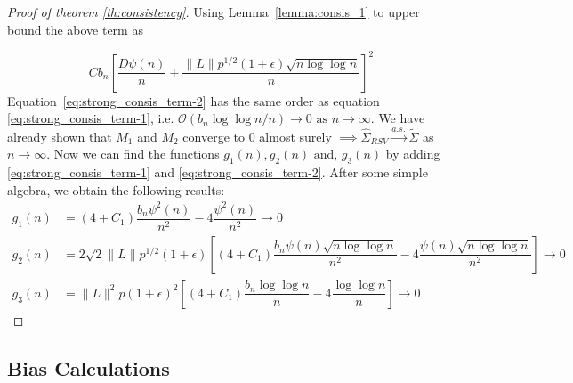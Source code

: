\documentclass[12pt]{article}
\theoremstyle{remark}
\begin{document}
\begin{proof}[Proof of theorem \ref{th:consistency}]
Using Lemma~\ref{lemma:consis_1} to upper bound the above term as 

\begin{equation} \label{eq:strong_consis_term-2}
     Cb_n\left[ \dfrac{D \psi(n)}{n} + \dfrac{\|L\| p^{1/2}(1+\epsilon)\sqrt{n \log\log n}}{n}  \right]^2
\end{equation}
%
Equation~\eqref{eq:strong_consis_term-2} has the same order as equation \eqref{eq:strong_consis_term-1}, i.e. $\mathcal{O}\left(b_n \log \log n/n\right) \to 0 \textrm{ as } n \to \infty$.
We have already shown that $M_1$ and $M_2$ converge to 0 almost surely $\implies \hat{\Sigma}_{RSV} \xrightarrow{a.s.} \tilde{\Sigma}$ as $n \to \infty$. Now we can find the functions $g_1(n), g_2(n) \textrm{ and, } g_3(n)$ by adding \eqref{eq:strong_consis_term-1} and \eqref{eq:strong_consis_term-2}. After some simple algebra, we obtain the following results:
%
\begin{align*}
    g_1(n) &= (4+C_1)\dfrac{b_n \psi^2(n)}{n^2} - 4\dfrac{\psi^2(n)}{n^2} \to 0\\
    g_2(n) &= 2\sqrt{2}\|L\|p^{1/2}(1+\epsilon)\left[(4+C_1)\dfrac{b_n\psi(n)\sqrt{n\log \log n}}{n^2} - 4\dfrac{\psi(n)\sqrt{n\log \log n}}{n^2}\right] \to 0\\
    g_3(n) &= \|L\|^2 p (1+\epsilon)^2\left[(4+C_1)\dfrac{b_n \log\log n}{n} - 4 \dfrac{\log \log n}{n}\right] \to 0
\end{align*}
\end{proof}

\subsection{Bias Calculations} \label{appendix:bias}
\end{document}
